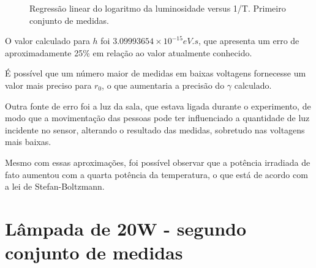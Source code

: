 \documentclass[brazilian,12pt,a4paper,final]{article}
\begin{document}
\begin{figure}[htbp!]
  \caption{Regressão linear do logaritmo da luminosidade versus 1/T. Primeiro conjunto de medidas.}
  \label{fighum}
  \centering
\end{figure}

O valor calculado para $h$ foi $3.09993654 \times 10^{-15} eV.s$, que apresenta
um erro de aproximadamente 25\% em relação ao valor atualmente conhecido.

É possível que um número maior de medidas em baixas voltagens fornecesse
um valor mais preciso para $r_0$, o que aumentaria a precisão do $\gamma$
calculado.

Outra fonte de erro foi a luz da sala, que estava ligada durante o 
experimento, de modo que a movimentação das pessoas pode ter influenciado
a quantidade de luz incidente no sensor, 
alterando o resultado das medidas, sobretudo nas voltagens mais baixas.

Mesmo com essas aproximações, 
foi possível observar que a potência irradiada de fato aumentou
com a quarta potência da temperatura, 
o que está de acordo com a lei de Stefan-Boltzmann.

\section{Lâmpada de 20W - segundo conjunto de medidas}
\end{document}
